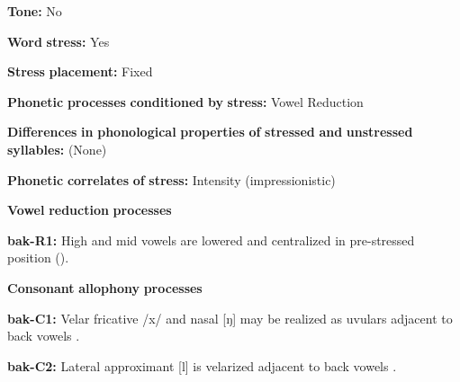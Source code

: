 \documentclass[output=paper]{langsci/langscibook}
\begin{document}
\begin{styleBody}
\textbf{Tone:} No
\end{styleBody}

\begin{styleBody}
\textbf{Word} \textbf{stress:} Yes
\end{styleBody}

\begin{styleBody}
\textbf{Stress} \textbf{placement:} Fixed
\end{styleBody}

\begin{styleBody}
\textbf{Phonetic} \textbf{processes} \textbf{conditioned} \textbf{by} \textbf{stress:} Vowel Reduction
\end{styleBody}

\begin{styleBody}
\textbf{Differences} \textbf{in} \textbf{phonological} \textbf{properties} \textbf{of} \textbf{stressed} \textbf{and} \textbf{unstressed} \textbf{syllables:} (None)
\end{styleBody}

\begin{styleBody}
\textbf{Phonetic} \textbf{correlates} \textbf{of} \textbf{stress:} Intensity (impressionistic)
\end{styleBody}

\begin{styleBody}
\textbf{Vowel} \textbf{reduction} \textbf{processes}
\end{styleBody}

\begin{styleBody}
\textbf{bak-R1:} High and mid vowels are lowered and centralized in pre-stressed position (\citealt{CarterRobbins2015}).
\end{styleBody}

\begin{styleBody}
\textbf{Consonant} \textbf{allophony} \textbf{processes}
\end{styleBody}

\begin{styleBody}
\textbf{bak-C1:} Velar fricative /x/ and nasal [ŋ] may be realized as uvulars adjacent to back vowels \citep[11]{Poppe1964}.
\end{styleBody}

\begin{styleBody}
\textbf{bak-C2:} Lateral approximant [l] is velarized adjacent to back vowels \citep[10]{Poppe1964}.
\end{styleBody}
\end{document}
